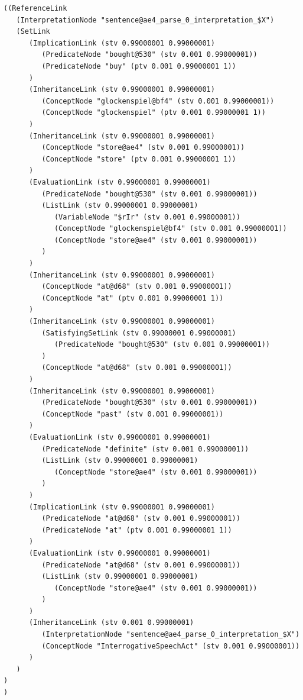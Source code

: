  {\tt\begin{tiny}\begin{lstlisting}
((ReferenceLink
   (InterpretationNode "sentence@ae4_parse_0_interpretation_$X")
   (SetLink
      (ImplicationLink (stv 0.99000001 0.99000001)
         (PredicateNode "bought@530" (stv 0.001 0.99000001))
         (PredicateNode "buy" (ptv 0.001 0.99000001 1))
      )
      (InheritanceLink (stv 0.99000001 0.99000001)
         (ConceptNode "glockenspiel@bf4" (stv 0.001 0.99000001))
         (ConceptNode "glockenspiel" (ptv 0.001 0.99000001 1))
      )
      (InheritanceLink (stv 0.99000001 0.99000001)
         (ConceptNode "store@ae4" (stv 0.001 0.99000001))
         (ConceptNode "store" (ptv 0.001 0.99000001 1))
      )
      (EvaluationLink (stv 0.99000001 0.99000001)
         (PredicateNode "bought@530" (stv 0.001 0.99000001))
         (ListLink (stv 0.99000001 0.99000001)
            (VariableNode "$rIr" (stv 0.001 0.99000001))
            (ConceptNode "glockenspiel@bf4" (stv 0.001 0.99000001))
            (ConceptNode "store@ae4" (stv 0.001 0.99000001))
         )
      )
      (InheritanceLink (stv 0.99000001 0.99000001)
         (ConceptNode "at@d68" (stv 0.001 0.99000001))
         (ConceptNode "at" (ptv 0.001 0.99000001 1))
      )
      (InheritanceLink (stv 0.99000001 0.99000001)
         (SatisfyingSetLink (stv 0.99000001 0.99000001)
            (PredicateNode "bought@530" (stv 0.001 0.99000001))
         )
         (ConceptNode "at@d68" (stv 0.001 0.99000001))
      )
      (InheritanceLink (stv 0.99000001 0.99000001)
         (PredicateNode "bought@530" (stv 0.001 0.99000001))
         (ConceptNode "past" (stv 0.001 0.99000001))
      )
      (EvaluationLink (stv 0.99000001 0.99000001)
         (PredicateNode "definite" (stv 0.001 0.99000001))
         (ListLink (stv 0.99000001 0.99000001)
            (ConceptNode "store@ae4" (stv 0.001 0.99000001))
         )
      )
      (ImplicationLink (stv 0.99000001 0.99000001)
         (PredicateNode "at@d68" (stv 0.001 0.99000001))
         (PredicateNode "at" (ptv 0.001 0.99000001 1))
      )
      (EvaluationLink (stv 0.99000001 0.99000001)
         (PredicateNode "at@d68" (stv 0.001 0.99000001))
         (ListLink (stv 0.99000001 0.99000001)
            (ConceptNode "store@ae4" (stv 0.001 0.99000001))
         )
      )
      (InheritanceLink (stv 0.001 0.99000001)
         (InterpretationNode "sentence@ae4_parse_0_interpretation_$X")
         (ConceptNode "InterrogativeSpeechAct" (stv 0.001 0.99000001))
      )
   )
)
)

\end{lstlisting}\end{tiny}}

